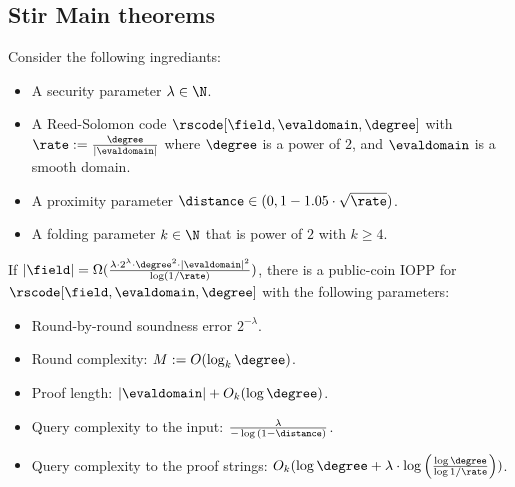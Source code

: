 \subsection{Stir Main theorems}

\begin{theorem}\label{thm:stir}
    Consider the following ingrediants:
    \begin{itemize}
        \item A security parameter $\lambda\in\N$.
        \item A Reed-Solomon code $\rscode[\field,\evaldomain,\degree]$ with $\rate:=\frac{\degree}{|\evaldomain|}$ where $\degree$ is a power of $2$, and $\evaldomain$ is a smooth domain.
        \item A proximity parameter $\distance\in(0,1-1.05\cdot\sqrt{\rate})$.
        \item A folding parameter $k\in\N$ that is power of $2$ with $k\geq 4$.
    \end{itemize}
If $|\field|=\Omega(\frac{\lambda\cdot2^\lambda\cdot\degree^2\cdot{|\evaldomain|}^2}{\log(1/\rate)})$, there is a public-coin IOPP for $\rscode[\field,\evaldomain,\degree]$ with the following parameters:
\begin{itemize}
    \item Round-by-round soundness error $2^{-\lambda}$.
    \item Round complexity: $M:=O(\log_k{\degree})$.
    \item Proof length: $|\evaldomain|+O_k(\log{\degree})$.
    \item Query complexity to the input: $\frac{\lambda}{-\log{(1-\distance)}}$.
    \item Query complexity to the proof strings: $O_k(\log{\degree}+\lambda\cdot\log{\Big(\frac{\log{\degree}}{\log{1/\rate}}\Big)})$.
\end{itemize}
\end{theorem}

